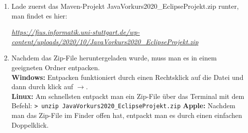 
\newcommand{\jvkpackage}{JavaVorkurs2020\_EclipseProjekt.zip}
\newcommand{\jvkpackageurl}{https://fius.informatik.uni-stuttgart.de/wp-content/uploads/2020/10/JavaVorkurs2020\_EclipseProjekt.zip}



\begin{Infobox}
    \begin{enumerate}[label=\arabic*.]
        \item Lade zuerst das Maven-Projekt \jvkpackage { }runter, man findet es hier:
        \begin{center}
            \color{blue}\href{\jvkpackageurl}{\textit{\jvkpackageurl}}
        \end{center}

        \item Nachdem das Zip-File heruntergeladen wurde, muss man es in einem geeigneten Ordner entpacken.\\
        \textbf{Windows:} Entpacken funktioniert durch einen Rechtsklick auf die Datei und dann durch klick auf $\to$.\\
        \textbf{Linux:} Am schnellsten entpackt man ein Zip-File über das Terminal mit dem Befehl:
        \newline\hspace*{\fill}\texttt{\textgreater\ unzip \jvkpackage}\hspace*{\fill}\newline
        \textbf{Apple:} Nachdem man das Zip-File im Finder offen hat, entpackt man es durch einen einfachen Doppelklick.
    \end{enumerate}
\end{Infobox}


